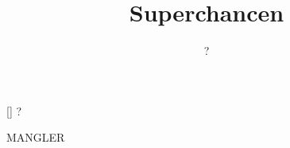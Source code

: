 \documentclass[a4paper,11pt]{article}
\title{Superchancen}
\author{?}
\begin{document}
\maketitle

\begin{roles}
[] ?
\end{roles}

\begin{sketch}

MANGLER

\end{sketch}
\end{document}
